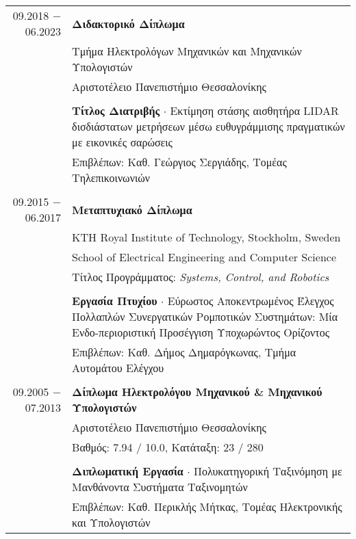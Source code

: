 \documentclass[a4paper,10pt,twoside]{article}
\begin{document}
\begin{tabular}{rp{11cm}}
09.2018 $-$ 06.2023 & \textbf{Διδακτορικό Δίπλωμα} \\
                    & Τμήμα Ηλεκτρολόγων Μηχανικών και Μηχανικών Υπολογιστών \\
                    & Αριστοτέλειο Πανεπιστήμιο Θεσσαλονίκης \\

&\\                 & \textbf{Τίτλος Διατριβής} $\cdot$ Εκτίμηση στάσης αισθητήρα LIDAR δισδιάστατων μετρήσεων μέσω ευθυγράμμισης πραγματικών με εικονικές σαρώσεις\\
                    & Επιβλέπων: Καθ. Γεώργιος Σεργιάδης, Τομέας Τηλεπικοινωνιών\\

&\\
09.2015 $-$ 06.2017 & \textbf{Μεταπτυχιακό Δίπλωμα} \\
                    & KTH Royal Institute of Technology, Stockholm, Sweden\\
                    & School of Electrical Engineering and Computer Science\\
                    & Τίτλος Προγράμματος: \textit{Systems, Control, and Robotics}\\

&\\                 & \textbf{Εργασία Πτυχίου} $\cdot$ Εύρωστος Αποκεντρωμένος Έλεγχος Πολλαπλών Συνεργατικών Ρομποτικών Συστημάτων: Μία Ενδο-περιοριστική
                      Προσέγγιση Υποχωρώντος Ορίζοντος \\
                    & Επιβλέπων: Καθ. Δήμος Δημαρόγκωνας, Τμήμα Αυτομάτου Ελέγχου\\
&\\
09.2005 $-$ 07.2013 & \textbf{Δίπλωμα Ηλεκτρολόγου Μηχανικού \& Μηχανικού Υπολογιστών} \\
                    & Αριστοτέλειο Πανεπιστήμιο Θεσσαλονίκης \\
                    & Βαθμός: 7.94 / 10.0, Κατάταξη: 23 / 280 \\
&\\
                    & \textbf{Διπλωματική Εργασία} $\cdot$ Πολυκατηγορική Ταξινόμηση με Μανθάνοντα Συστήματα Ταξινομητών\\
                    & Επιβλέπων: Καθ. Περικλής Μήτκας, Τομέας Ηλεκτρονικής και Υπολογιστών\\
\end{tabular}\\
\end{document}
